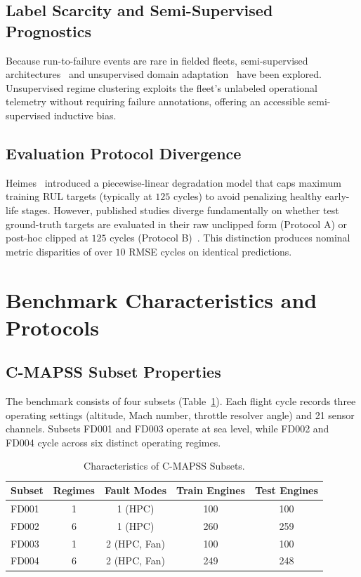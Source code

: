 \documentclass[conference]{IEEEtran}
\begin{document}
\subsection{Label Scarcity and Semi-Supervised Prognostics}
Because run-to-failure events are rare in fielded fleets, semi-supervised architectures~\cite{listou2020semi} and unsupervised domain adaptation~\cite{da2021transfer, ragab2020adversarial} have been explored. Unsupervised regime clustering exploits the fleet's unlabeled operational telemetry without requiring failure annotations, offering an accessible semi-supervised inductive bias.

\subsection{Evaluation Protocol Divergence}
Heimes~\cite{heimes2008recurrent} introduced a piecewise-linear degradation model that caps maximum training RUL targets (typically at $125$ cycles) to avoid penalizing healthy early-life stages. However, published studies diverge fundamentally on whether test ground-truth targets are evaluated in their raw unclipped form (Protocol A) or post-hoc clipped at $125$ cycles (Protocol B)~\cite{ramasso2014investigating, gupta2024auditing}. This distinction produces nominal metric disparities of over $10$ RMSE cycles on identical predictions.

\section{Benchmark Characteristics and Protocols}

\subsection{C-MAPSS Subset Properties}
The benchmark consists of four subsets (Table~\ref{tab:subsets}). Each flight cycle records three operating settings (altitude, Mach number, throttle resolver angle) and 21 sensor channels. Subsets FD001 and FD003 operate at sea level, while FD002 and FD004 cycle across six distinct operating regimes.

\begin{table}[t]
\caption{Characteristics of C-MAPSS Subsets.}
\label{tab:subsets}
\centering
\begin{tabular}{lcccc}
\toprule
Subset & Regimes & Fault Modes & Train Engines & Test Engines \\
\midrule
FD001 & 1 & 1 (HPC) & 100 & 100 \\
FD002 & 6 & 1 (HPC) & 260 & 259 \\
FD003 & 1 & 2 (HPC, Fan) & 100 & 100 \\
FD004 & 6 & 2 (HPC, Fan) & 249 & 248 \\
\bottomrule
\end{tabular}
\end{table}
\end{document}
